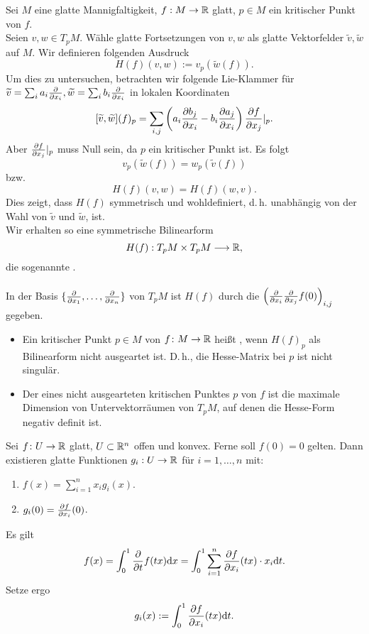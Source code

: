 Sei $M$ eine glatte Mannigfaltigkeit, $f : M \overset{}{\rightarrow} \mathbb{R}$ glatt, $p \in M$ ein kritischer Punkt von $f$.\\
Seien $v,w \in T_pM$. Wähle glatte Fortsetzungen von $v,w$ als glatte Vektorfelder $\widetilde{v}, \widetilde{w}$ auf $M$. Wir definieren folgenden Ausdruck
\[ H(f)(v,w) := v_p(\widetilde{w}(f)). \]
Um dies zu untersuchen, betrachten wir folgende Lie-Klammer für $\widetilde{v} = \sum_i a_i \frac{\partial }{\partial x_i}, \widetilde{w} = \sum_i b_i \frac{\partial }{\partial x_i}$ in lokalen Koordinaten
\[ [\widetilde{v}, \widetilde{w}](f)_p = \sum_{i,j} \left(
a_i \frac{\partial b_j}{\partial x_i} - b_i \frac{\partial a_j}{\partial x_i}
\right) \frac{\partial f}{\partial x_j}|_{p}. \]
Aber $\frac{\partial f}{\partial x_j}|_{p}$ muss Null sein, da $p$ ein kritischer Punkt ist. Es folgt
\[ v_p(\widetilde{w}(f)) = w_p(\widetilde{v}(f)) \]
bzw.
\[ H(f)(v,w) = H(f)(w,v). \]
Dies zeigt, dass $H(f)$ symmetrisch und wohldefiniert, d.\,h. unabhängig von der Wahl von $\widetilde{v}$ und $\widetilde{w}$, ist.\\
Wir erhalten so eine symmetrische Bilinearform
\[ H(f) : T_pM \times T_pM \overset{}{\longrightarrow} \mathbb{R}, \]
die sogenannte .\\\\

In der Basis $\{\frac{\partial }{\partial x_1}, \ldots, \frac{\partial }{\partial x_n}\}$ von $T_pM$ ist $H(f)$ durch die  $\left(\frac{\partial }{\partial x_i}\frac{\partial }{\partial x_j}f(0)\right)_{i,j}$ gegeben.

\Def{}
\begin{itemize}
	\item Ein kritischer Punkt $p \in M$ von $f\colon M \overset{}{\rightarrow} \mathbb{R}$ heißt , wenn $H(f)_p$ als Bilinearform nicht ausgeartet ist. D.\,h., die Hesse-Matrix bei $p$ ist nicht singulär.
	\item Der  eines nicht ausgearteten kritischen Punktes $p$ von $f$ ist die maximale Dimension von Untervektorräumen von $T_pM$, auf denen die Hesse-Form negativ definit ist.
\end{itemize}

\Lem{}
Sei $f\colon U \overset{}{\rightarrow} \mathbb{R}$ glatt, $U \subset \mathbb{R}^n$ offen und konvex. Ferne soll $f(0) = 0$ gelten. Dann existieren glatte Funktionen $g_i : U \overset{}{\rightarrow} \mathbb{R}$ für $i = 1, \ldots, n$ mit:
\begin{enumerate}[1.]
	\item $f(x) = \sum_{i = 1}^n x_i g_i(x)$.
	\item $g_i(0) = \frac{\partial f}{\partial x_i}(0)$.
\end{enumerate}
\begin{Beweis}{}
Es gilt
\[ f(x) = \int_0^1 \frac{\partial }{\partial t}f(tx) \text{d} x = \int_0^1 \sum_{i = 1}^n \frac{\partial f}{\partial x_i} (tx) \cdot x_i \text{d} t.   \]
Setze ergo
\[ g_i(x) := \int_{0}^1 \frac{\partial f}{\partial x_i} (tx) \text{d} t. \]
\end{Beweis}

